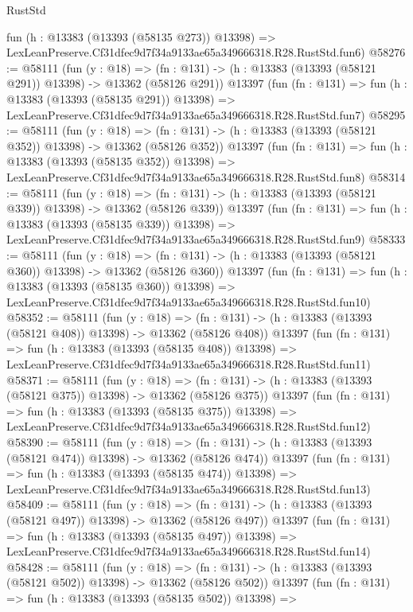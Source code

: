 \begin{lexlean}{RustStd}
\begin{coremodule}
    fun (h : @13383 (@13393 (@58135 @273)) @13398) =>
    LexLeanPreserve.Cf31dfec9d7f34a9133ae65a349666318.R28.RustStd.fun6)
@58276 := @58111
    (fun (y : @18) =>
    (fn : @131) -> (h : @13383 (@13393 (@58121 @291)) @13398) -> @13362 (@58126 @291))
    @13397
    (fun (fn : @131) =>
    fun (h : @13383 (@13393 (@58135 @291)) @13398) =>
    LexLeanPreserve.Cf31dfec9d7f34a9133ae65a349666318.R28.RustStd.fun7)
@58295 := @58111
    (fun (y : @18) =>
    (fn : @131) -> (h : @13383 (@13393 (@58121 @352)) @13398) -> @13362 (@58126 @352))
    @13397
    (fun (fn : @131) =>
    fun (h : @13383 (@13393 (@58135 @352)) @13398) =>
    LexLeanPreserve.Cf31dfec9d7f34a9133ae65a349666318.R28.RustStd.fun8)
@58314 := @58111
    (fun (y : @18) =>
    (fn : @131) -> (h : @13383 (@13393 (@58121 @339)) @13398) -> @13362 (@58126 @339))
    @13397
    (fun (fn : @131) =>
    fun (h : @13383 (@13393 (@58135 @339)) @13398) =>
    LexLeanPreserve.Cf31dfec9d7f34a9133ae65a349666318.R28.RustStd.fun9)
@58333 := @58111
    (fun (y : @18) =>
    (fn : @131) -> (h : @13383 (@13393 (@58121 @360)) @13398) -> @13362 (@58126 @360))
    @13397
    (fun (fn : @131) =>
    fun (h : @13383 (@13393 (@58135 @360)) @13398) =>
    LexLeanPreserve.Cf31dfec9d7f34a9133ae65a349666318.R28.RustStd.fun10)
@58352 := @58111
    (fun (y : @18) =>
    (fn : @131) -> (h : @13383 (@13393 (@58121 @408)) @13398) -> @13362 (@58126 @408))
    @13397
    (fun (fn : @131) =>
    fun (h : @13383 (@13393 (@58135 @408)) @13398) =>
    LexLeanPreserve.Cf31dfec9d7f34a9133ae65a349666318.R28.RustStd.fun11)
@58371 := @58111
    (fun (y : @18) =>
    (fn : @131) -> (h : @13383 (@13393 (@58121 @375)) @13398) -> @13362 (@58126 @375))
    @13397
    (fun (fn : @131) =>
    fun (h : @13383 (@13393 (@58135 @375)) @13398) =>
    LexLeanPreserve.Cf31dfec9d7f34a9133ae65a349666318.R28.RustStd.fun12)
@58390 := @58111
    (fun (y : @18) =>
    (fn : @131) -> (h : @13383 (@13393 (@58121 @474)) @13398) -> @13362 (@58126 @474))
    @13397
    (fun (fn : @131) =>
    fun (h : @13383 (@13393 (@58135 @474)) @13398) =>
    LexLeanPreserve.Cf31dfec9d7f34a9133ae65a349666318.R28.RustStd.fun13)
@58409 := @58111
    (fun (y : @18) =>
    (fn : @131) -> (h : @13383 (@13393 (@58121 @497)) @13398) -> @13362 (@58126 @497))
    @13397
    (fun (fn : @131) =>
    fun (h : @13383 (@13393 (@58135 @497)) @13398) =>
    LexLeanPreserve.Cf31dfec9d7f34a9133ae65a349666318.R28.RustStd.fun14)
@58428 := @58111
    (fun (y : @18) =>
    (fn : @131) -> (h : @13383 (@13393 (@58121 @502)) @13398) -> @13362 (@58126 @502))
    @13397
    (fun (fn : @131) =>
    fun (h : @13383 (@13393 (@58135 @502)) @13398) =>

\end{coremodule}
\end{lexlean}

